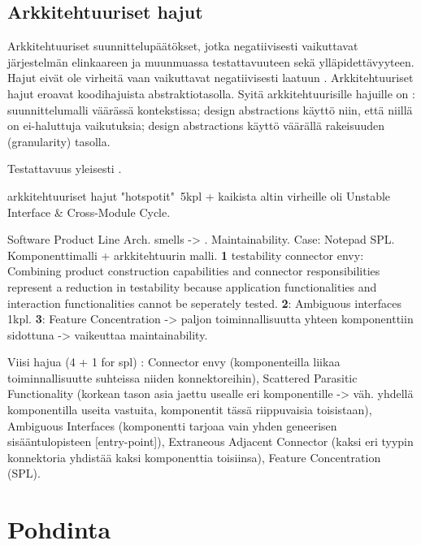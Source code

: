 \documentclass[finnish]{tktltiki2}
\theoremstyle{definition}
\theoremstyle{remark}
\begin{document}
\subsection{Arkkitehtuuriset hajut}

Arkkitehtuuriset suunnittelupäätökset, jotka negatiivisesti vaikuttavat järjestelmän elinkaareen ja muunmuassa testattavuuteen sekä ylläpidettävyyteen. Hajut eivät ole virheitä vaan vaikuttavat negatiivisesti laatuun \citep[s. 1]{de_andrade_architectural_2014}. Arkkitehtuuriset hajut eroavat koodihajuista abstraktiotasolla. Syitä arkkitehtuurisille hajuille on \citep[s. 2]{de_andrade_architectural_2014}: suunnittelumalli väärässä kontekstissa; design abstractions käyttö niin, että niillä on ei-haluttuja vaikutuksia; design abstractions käyttö väärällä rakeisuuden (granularity) tasolla. 

Testattavuus \citep{garcia_identifying_2009} yleisesti \citep{bertran_detecting_2011}.

\citep{HotSpot} arkkitehtuuriset hajut "hotspotit"\ 5kpl + kaikista altin virheille oli \citep[s. 57]{HotSpot} Unstable Interface \& Cross-Module Cycle.

Software Product Line Arch. smells -> \citep{de_andrade_architectural_2014}. Maintainability. Case: Notepad SPL. Komponenttimalli + arkkitehtuurin malli. \textbf{1} testability connector envy: Combining product construction capabilities and connector responsibilities represent a reduction in testability because application functionalities and interaction functionalities cannot be seperately tested. \textbf{2}: Ambiguous interfaces 1kpl. \textbf{3}: Feature Concentration -> paljon toiminnallisuutta yhteen komponenttiin sidottuna -> vaikeuttaa maintainability.  

Viisi hajua (4 + 1 for spl) \citep{garcia_toward_2009}: Connector envy (komponenteilla liikaa toiminnallisuutte suhteissa niiden konnektoreihin), Scattered Parasitic Functionality (korkean tason asia jaettu usealle eri komponentille -> väh. yhdellä komponentilla useita vastuita, komponentit tässä riippuvaisia toisistaan), Ambiguous Interfaces (komponentti tarjoaa vain yhden geneerisen sisääntulopisteen [entry-point]), Extraneous Adjacent Connector (kaksi eri tyypin konnektoria yhdistää kaksi komponenttia toisiinsa), Feature Concentration (SPL). 



\section{Pohdinta}
\end{document}
